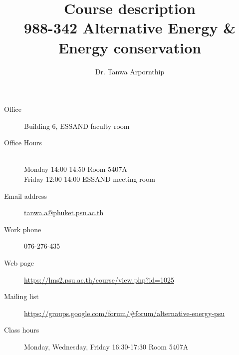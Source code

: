 \documentclass[a4paper,12pt]{article}
\begin{document}

\title{Course description\\ \large 988-342 Alternative Energy \& Energy conservation}
\author{Dr. Tanwa Arpornthip}
\date{}


\maketitle

\noindent\makebox[\linewidth]{\rule{\linewidth}{0.4pt}}
\begin{description}
\item [Office] Building 6, ESSAND faculty room
\item [Office Hours] \hfill \\
    Monday 14:00-14:50 Room 5407A \hfill\\
    Friday 12:00-14:00 ESSAND meeting room
\item [Email address] \href{mailto:tanwa.a@phuket.psu.ac.th}{tanwa.a@phuket.psu.ac.th}
\item [Work phone] 076-276-435
\item [Web page] \href{https://lms2.psu.ac.th/course/view.php?id=1025}{https://lms2.psu.ac.th/course/view.php?id=1025}
\item [Mailing list] \href{https://groups.google.com/forum/\#\!forum/alternative-energy-psu}{https://groups.google.com/forum/\#\!forum/alternative-energy-psu}
\item [Class hours] Monday, Wednesday, Friday 16:30-17:30 Room 5407A
\end{description}
\noindent\makebox[\linewidth]{\rule{\linewidth}{0.4pt}}
\end{document}
